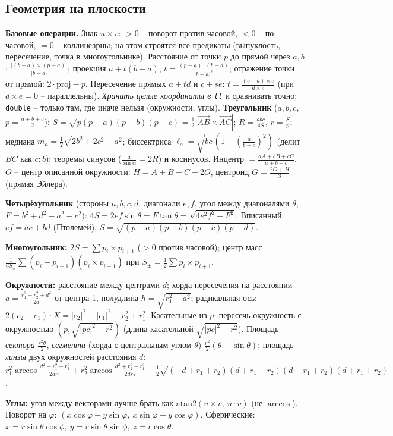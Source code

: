 \subsection{Геометрия на плоскости}
\textbf{Базовые операции.} Знак $u\times v$: $>0$ -- поворот против часовой, $<0$ -- по часовой, $=0$ -- коллинеарны; на этом строятся все предикаты (выпуклость, пересечение, точка в многоугольнике). Расстояние от точки $p$ до прямой через $a,b$: $\frac{|(b-a)\times(p-a)|}{|b-a|}$; проекция $a+t(b-a)$, $t=\frac{(p-a)\cdot(b-a)}{|b-a|^2}$; отражение точки от прямой: $2\cdot\mathrm{proj}-p$. Пересечение прямых $a+td$ и $c+se$: $t=\frac{(c-a)\times e}{d\times e}$ (при $d\times e=0$ -- параллельны). \emph{Хранить целые координаты в \texttt{ll}} и сравнивать точно; \texttt{double} -- только там, где иначе нельзя (окружности, углы).
\textbf{Треугольник} ($a,b,c$, $p=\frac{a+b+c}2$): $S=\sqrt{p(p{-}a)(p{-}b)(p{-}c)}=\frac12|\vec{AB}\times\vec{AC}|$; $R=\frac{abc}{4S}$, $r=\frac Sp$; медиана $m_a=\frac12\sqrt{2b^2{+}2c^2{-}a^2}$; биссектриса $\ell_a=\sqrt{bc\,(1-(\frac a{b+c})^2)}$ (делит $BC$ как $c{:}b$); теоремы синусов ($\frac a{\sin\alpha}=2R$) и косинусов. Инцентр $=\frac{aA+bB+cC}{a+b+c}$. $O$ -- центр описанной окружности: $H=A{+}B{+}C-2O$, центроид $G=\frac{2O+H}3$ (прямая Эйлера).
\par \textbf{Четырёхугольник} (стороны $a,b,c,d$, диагонали $e,f$, угол между диагоналями $\theta$, $F=b^2{+}d^2{-}a^2{-}c^2$): $4S=2ef\sin\theta=F\tan\theta=\sqrt{4e^2f^2-F^2}$. Вписанный: $ef=ac+bd$ (Птолемей), $S=\sqrt{(p{-}a)(p{-}b)(p{-}c)(p{-}d)}$.
\par \textbf{Многоугольник:} $2S=\sum p_i\times p_{i+1}$ ($>0$ против часовой); центр масс $\frac1{6S_{\pm}}\sum(p_i{+}p_{i+1})(p_i\times p_{i+1})$ при $S_\pm=\frac12\sum p_i\times p_{i+1}$.
\par \textbf{Окружности:} расстояние между центрами $d$; хорда пересечения на расстоянии $a=\frac{r_1^2-r_2^2+d^2}{2d}$ от центра 1, полудлина $h=\sqrt{r_1^2-a^2}$; радикальная ось: $2(c_2{-}c_1)\cdot X=|c_2|^2-|c_1|^2-r_2^2+r_1^2$. Касательные из $p$: пересечь окружность с окружностью $(p,\sqrt{|pc|^2-r^2})$ (длина касательной $\sqrt{|pc|^2-r^2}$). Площадь \emph{сектора} $\frac{r^2\theta}2$, \emph{сегмента} (хорда с центральным углом $\theta$) $\frac{r^2}2(\theta-\sin\theta)$; площадь \emph{линзы} двух окружностей расстояния $d$: $r_1^2\arccos\frac{d^2+r_1^2-r_2^2}{2dr_1}+r_2^2\arccos\frac{d^2+r_2^2-r_1^2}{2dr_2}-\frac12\sqrt{(-d+r_1+r_2)(d+r_1-r_2)(d-r_1+r_2)(d+r_1+r_2)}$.
\par \textbf{Углы:} угол между векторами лучше брать как $\mathrm{atan2}(u\times v,\ u\cdot v)$ (не $\arccos$). Поворот на $\varphi$: $(x\cos\varphi-y\sin\varphi,\ x\sin\varphi+y\cos\varphi)$. Сферические: $x=r\sin\theta\cos\phi,\ y=r\sin\theta\sin\phi,\ z=r\cos\theta$.
